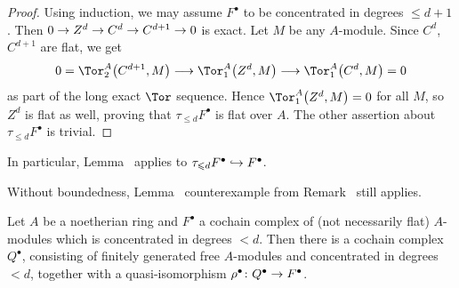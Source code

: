 \documentclass[a4paper,parskip=half,numbers=enddot, DIV=12]{scrreprt}
\renewcommand{\leq}{\leqslant}
\begin{document}
\begin{proof}
	Using induction, we may assume $F^\bullet$ to be concentrated in degrees $\leq d+1$. Then $0\morphism Z^d\morphism C^d\morphism C^{d+1}\morphism 0$ is exact. Let $M$ be any $A$-module. Since $C^d$, $C^{d+1}$ are flat, we get
	\begin{align*}
		0=\Tor_2^A\big(C^{d+1},M\big)\morphism \Tor_1^A\big(Z^d,M\big)\morphism \Tor_1^A\big(C^{d},M\big)=0
	\end{align*}
	as part of the long exact $\Tor$ sequence. Hence $\Tor_1^A\big(Z^d,M\big)=0$ for all $M$, so $Z^d$ is flat as well, proving that $\tau_{\leq d}F^\bullet$ is flat over $A$. The other assertion about $\tau_{\leq d}F^\bullet$ is trivial.
\end{proof}
\begin{rem}
	\begin{alphanumerate}
		\item In particular, Lemma~ applies to $\tau_{\leq d}F^\bullet\monomorphism F^\bullet$.
		\item Without boundedness, Lemma~ counterexample from Remark~ still applies.
	\end{alphanumerate}
\end{rem}
\begin{lem}
	Let $A$ be a noetherian ring and $F^\bullet$ a cochain complex of (not necessarily flat) $A$-modules which is concentrated in degrees $< d$. Then there is a cochain complex $Q^\bullet$, consisting of finitely generated free $A$-modules and concentrated in degrees $<d$, together with a quasi-isomorphism $\rho^\bullet\colon Q^\bullet\morphism F^\bullet$.
\end{lem}
\end{document}
